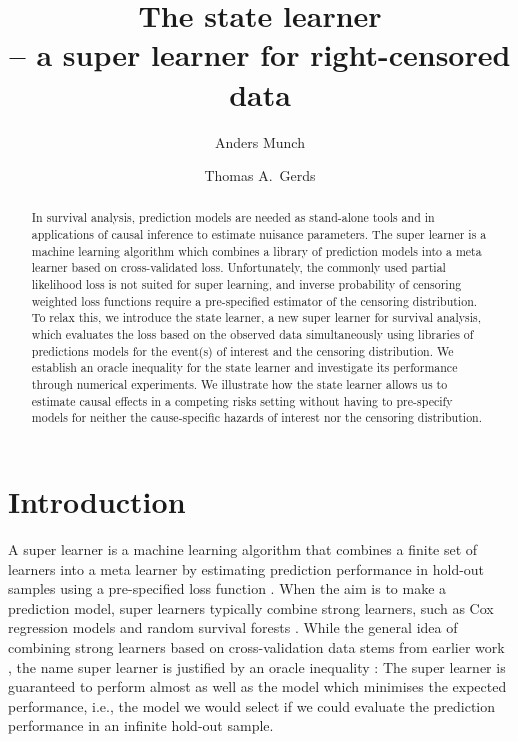 \documentclass{statsoc}
\title[The state learner]{The state learner \\ {-- a super learner for right-censored data}}
\author{Anders Munch}
\author[Munch {\it et al.}]{Thomas A.\ Gerds}
\newcommand{\1}{\mathds{1}}
\begin{document}
\begin{abstract}
  In survival analysis, prediction models are needed as stand-alone tools and in
  applications of causal inference to estimate nuisance parameters. The super
  learner is a machine learning algorithm which combines a library of prediction
  models into a meta learner based on cross-validated loss. Unfortunately, the
  commonly used partial likelihood loss is not suited for super learning, and
  inverse probability of censoring weighted loss functions require a
  pre-specified estimator of the censoring distribution. To relax this, we
  introduce the state learner, a new super learner for survival analysis, which
  evaluates the loss based on the observed data simultaneously using libraries
  of predictions models for the event(s) of interest and the censoring
  distribution. We establish an oracle inequality for the state learner and
  investigate its performance through numerical experiments. We illustrate how
  the state learner allows us to estimate causal effects in a competing risks
  setting without having to pre-specify models for neither the cause-specific
  hazards of interest nor the censoring distribution.
\end{abstract}


\section{Introduction}
\label{sec:introduction}

A super learner is a machine learning algorithm that combines a finite
set of learners into a meta learner by estimating prediction
performance in hold-out samples using a pre-specified loss function
\citep{van2007super}. When the aim is to make a prediction model,
super learners typically combine strong learners, such as Cox
regression models and random survival forests
\citep{gerds2021medical}.
While the general idea of combining strong learners based on cross-validation
data stems from earlier work \citep{wolpert1992stacked,breiman1996stacked}, the
name super learner is justified by an oracle inequality
\citep{van2003unicv,vaart2006oracle}: The super learner is guaranteed to perform
almost as well as the model which minimises the expected performance, i.e., the
model we would select if we could evaluate the prediction performance in an
infinite hold-out sample.
\end{document}
